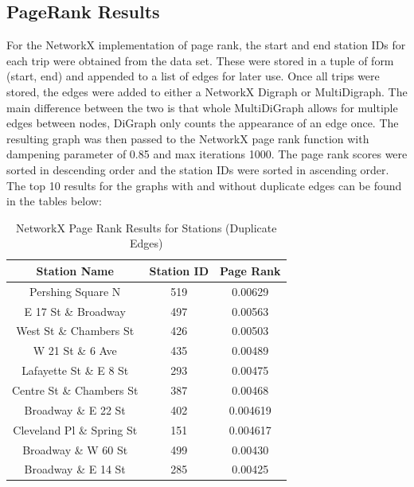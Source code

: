 \documentclass{article}
\begin{document}
\subsection{PageRank Results}
For the NetworkX implementation of page rank,  the start and end station IDs for each trip were obtained from the data set. These were stored in a tuple of form (start, end) and appended to a list of edges for later use. Once all trips were stored, the edges were added to either a NetworkX Digraph or MultiDigraph. The main difference between the two is that whole MultiDiGraph allows for multiple edges between nodes, DiGraph only counts the appearance of an edge once. The resulting graph was then passed to the NetworkX page rank function with dampening parameter of 0.85 and max iterations 1000. The page rank scores  were sorted in descending order and the station IDs were sorted in ascending order. The top 10 results for the graphs with and without duplicate edges can be found in the tables below: 
\begin{table}[h!]
\caption{NetworkX Page Rank Results for Stations (Duplicate Edges)}
\centering
 \begin{tabular}{||c c c||} 
 \hline
 Station Name & Station ID & Page Rank \\ [0.5ex] 
 \hline\hline
 Pershing Square N & 519 & 0.00629\\ 
 E 17 St \& Broadway & 497 & 0.00563\\
 West St \& Chambers St & 426 & 0.00503\\ 
 W 21 St \& 6 Ave & 435 & 0.00489\\
 Lafayette St \& E 8 St & 293 & 0.00475\\
 Centre St \& Chambers St & 387 & 0.00468\\
 Broadway \& E 22 St & 402 & 0.004619\\
 Cleveland Pl \& Spring St & 151 & 0.004617\\
 Broadway \& W 60 St & 499 & 0.00430\\
 Broadway \& E 14 St & 285 & 0.00425\\[1ex] 
 \hline
 \end{tabular}
 \end{table}
\end{document}
